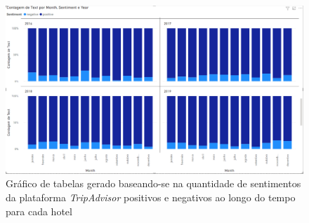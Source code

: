 \begin{figure}[!htb]
\centering
\includegraphics[width=16cm]{figuras/Pos&NegSentiments/TableGraph4.PNG}
\caption{Gráfico de tabelas gerado baseando-se na quantidade de sentimentos da plataforma \textit{TripAdvisor} positivos e negativos ao longo do tempo para cada hotel}
\label{fig:exemplofigposneg}
\end{figure}
